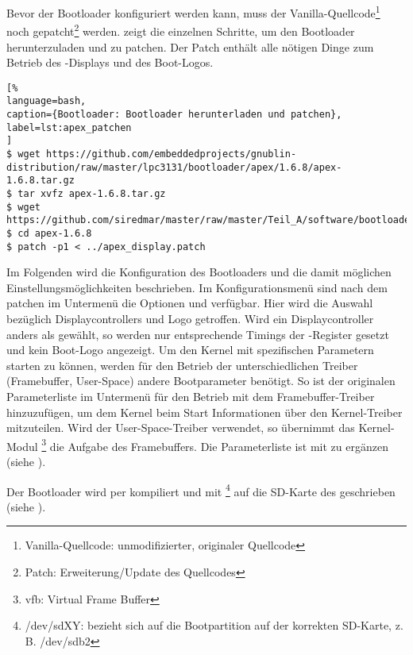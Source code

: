 Bevor der Bootloader konfiguriert werden kann, muss der Vanilla-Quellcode\footnote{Vanilla-Quellcode: unmodifizierter, originaler Quellcode} noch gepatcht\footnote{Patch: Erweiterung/Update des Quellcodes} werden.  zeigt die einzelnen Schritte, um den Bootloader herunterzuladen und zu patchen. Der Patch enthält alle nötigen Dinge zum Betrieb des -Displays und des Boot-Logos.

\begin{lstlisting}[%
language=bash,
caption={Bootloader: Bootloader herunterladen und patchen},
label=lst:apex_patchen
]
$ wget https://github.com/embeddedprojects/gnublin-distribution/raw/master/lpc3131/bootloader/apex/1.6.8/apex-1.6.8.tar.gz
$ tar xvfz apex-1.6.8.tar.gz
$ wget https://github.com/siredmar/master/raw/master/Teil_A/software/bootloader/apex_display.patch
$ cd apex-1.6.8
$ patch -p1 < ../apex_display.patch
\end{lstlisting}

Im Folgenden wird die Konfiguration des Bootloaders und die damit möglichen Einstellungsmöglichkeiten beschrieben. Im Konfigurationsmenü sind nach dem patchen im Untermenü  die Optionen  und  verfügbar. Hier wird die Auswahl bezüglich Displaycontrollers und Logo getroffen. Wird ein Displaycontroller anders als  gewählt, so werden nur entsprechende Timings der -Register gesetzt und kein Boot-Logo angezeigt. 
Um den Kernel mit spezifischen Parametern starten zu können, werden für den Betrieb der unterschiedlichen Treiber (Framebuffer, User-Space) andere Bootparameter benötigt. So ist der originalen Parameterliste  im Untermenü  für den Betrieb mit dem Framebuffer-Treiber  hinzuzufügen, um dem Kernel beim Start Informationen über den Kernel-Treiber \\mitzuteilen. Wird der User-Space-Treiber verwendet, so übernimmt das Kernel-Modul \footnote{vfb: Virtual Frame Buffer} die Aufgabe des Framebuffers. Die Parameterliste ist mit  zu ergänzen (siehe \cite{LinuxKernelFBCON}).

Der Bootloader wird per  kompiliert und mit \footnote{/dev/sdXY: bezieht sich auf die Bootpartition auf der korrekten SD-Karte, z. B. /dev/sdb2} auf die SD-Karte des  geschrieben (siehe \cite{GnublinWiki2013a}).
\newpage
